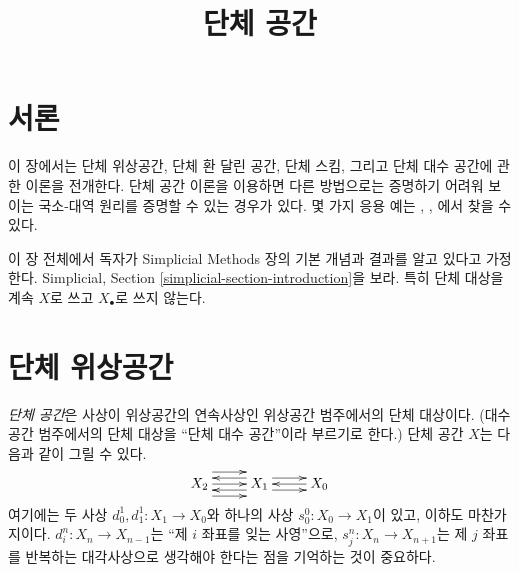 

%


\title{단체 공간}


\maketitle

\label{section-phantom}

\tableofcontents

\section{서론}
\label{section-introduction}

\noindent
이 장에서는 단체 위상공간, 단체 환 달린 공간, 단체 스킴,
그리고 단체 대수 공간에 관한 이론을 전개한다.
단체 공간 이론을 이용하면 다른 방법으로는 증명하기 어려워 보이는
국소-대역 원리를 증명할 수 있는 경우가 있다.
몇 가지 응용 예는
\cite{faltings_finiteness}, \cite{Kiehl}, \cite{HodgeIII}에서 찾을 수 있다.

\medskip\noindent
이 장 전체에서 독자가 Simplicial Methods 장의 기본 개념과 결과를
알고 있다고 가정한다. Simplicial, Section
\ref{simplicial-section-introduction}을 보라.
특히 단체 대상을 계속 $X$로 쓰고 $X_\bullet$로 쓰지 않는다.








\section{단체 위상공간}
\label{section-simplicial-top}

\noindent
{\it 단체 공간}은 사상이 위상공간의 연속사상인 위상공간 범주에서의
단체 대상이다. (대수 공간 범주에서의 단체 대상을
“단체 대수 공간”이라 부르기로 한다.)
단체 공간 $X$는 다음과 같이 그릴 수 있다.
$$
\xymatrix{
X_2
\ar@<2ex>[r]
\ar@<0ex>[r]
\ar@<-2ex>[r]
&
X_1
\ar@<1ex>[r]
\ar@<-1ex>[r]
\ar@<1ex>[l]
\ar@<-1ex>[l]
&
X_0
\ar@<0ex>[l]
}
$$
여기에는 두 사상 $d^1_0, d^1_1 : X_1 \to X_0$와
하나의 사상 $s^0_0 : X_0 \to X_1$이 있고, 이하도 마찬가지이다.
$d^n_i : X_n \to X_{n - 1}$는 “제
$i$ 좌표를 잊는 사영”으로, $s^n_j : X_n \to X_{n + 1}$는
제 $j$ 좌표를 반복하는 대각사상으로 생각해야 한다는 점을
기억하는 것이 중요하다.

